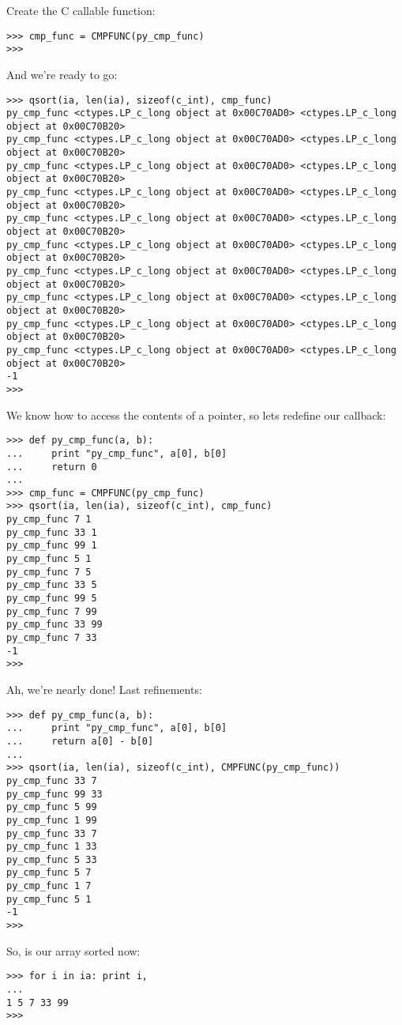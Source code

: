 Create the C callable function:
\begin{verbatim}
>>> cmp_func = CMPFUNC(py_cmp_func)
>>>
\end{verbatim}

And we're ready to go:
\begin{verbatim}
>>> qsort(ia, len(ia), sizeof(c_int), cmp_func)
py_cmp_func <ctypes.LP_c_long object at 0x00C70AD0> <ctypes.LP_c_long object at 0x00C70B20>
py_cmp_func <ctypes.LP_c_long object at 0x00C70AD0> <ctypes.LP_c_long object at 0x00C70B20>
py_cmp_func <ctypes.LP_c_long object at 0x00C70AD0> <ctypes.LP_c_long object at 0x00C70B20>
py_cmp_func <ctypes.LP_c_long object at 0x00C70AD0> <ctypes.LP_c_long object at 0x00C70B20>
py_cmp_func <ctypes.LP_c_long object at 0x00C70AD0> <ctypes.LP_c_long object at 0x00C70B20>
py_cmp_func <ctypes.LP_c_long object at 0x00C70AD0> <ctypes.LP_c_long object at 0x00C70B20>
py_cmp_func <ctypes.LP_c_long object at 0x00C70AD0> <ctypes.LP_c_long object at 0x00C70B20>
py_cmp_func <ctypes.LP_c_long object at 0x00C70AD0> <ctypes.LP_c_long object at 0x00C70B20>
py_cmp_func <ctypes.LP_c_long object at 0x00C70AD0> <ctypes.LP_c_long object at 0x00C70B20>
py_cmp_func <ctypes.LP_c_long object at 0x00C70AD0> <ctypes.LP_c_long object at 0x00C70B20>
-1
>>>
\end{verbatim}

We know how to access the contents of a pointer, so lets redefine our callback:
\begin{verbatim}
>>> def py_cmp_func(a, b):
...     print "py_cmp_func", a[0], b[0]
...     return 0
...
>>> cmp_func = CMPFUNC(py_cmp_func)
>>> qsort(ia, len(ia), sizeof(c_int), cmp_func)
py_cmp_func 7 1
py_cmp_func 33 1
py_cmp_func 99 1
py_cmp_func 5 1
py_cmp_func 7 5
py_cmp_func 33 5
py_cmp_func 99 5
py_cmp_func 7 99
py_cmp_func 33 99
py_cmp_func 7 33
-1
>>>
\end{verbatim}

Ah, we're nearly done! Last refinements:
\begin{verbatim}
>>> def py_cmp_func(a, b):
...     print "py_cmp_func", a[0], b[0]
...     return a[0] - b[0]
...
>>> qsort(ia, len(ia), sizeof(c_int), CMPFUNC(py_cmp_func))
py_cmp_func 33 7
py_cmp_func 99 33
py_cmp_func 5 99
py_cmp_func 1 99
py_cmp_func 33 7
py_cmp_func 1 33
py_cmp_func 5 33
py_cmp_func 5 7
py_cmp_func 1 7
py_cmp_func 5 1
-1
>>>
\end{verbatim}

So, is our array sorted now:
\begin{verbatim}
>>> for i in ia: print i,
...
1 5 7 33 99
>>>
\end{verbatim}

